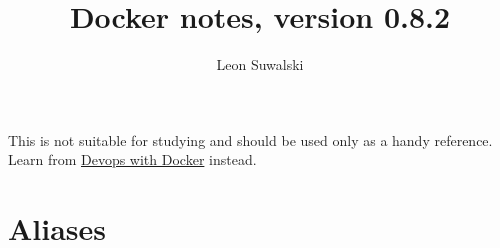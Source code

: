 \documentclass{charun}
\title{Docker notes, version 0.8.2}
\author{Leon Suwalski}
\begin{document}
\begin{multicols*}{2}
\maketitle
\raggedright

This is not suitable for studying and should be used only as a handy reference.
Learn from \href{https://devopswithdocker.com}{Devops with Docker} instead.









\section{Aliases}


\end{multicols*}
\end{document}
